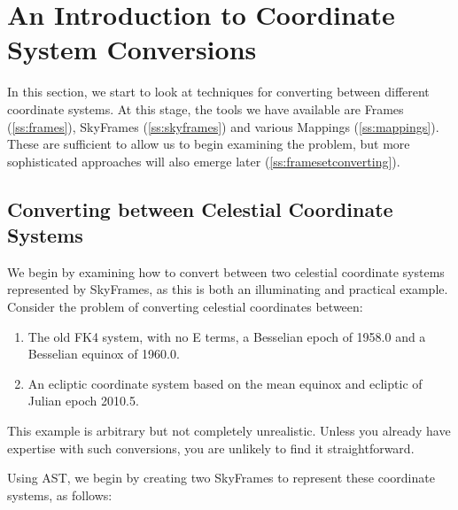 \documentclass[twoside,11pt]{article}
\newcommand{\secref}[1]{\S\ref{#1}}
\renewcommand{\secref}[1]{\ref{#1}}
\begin{document}

\cleardoublepage
\section{\label{ss:introducingconversion}An Introduction to Coordinate System Conversions}

In this section, we start to look at techniques for converting between
different coordinate systems.  At this stage, the tools we have
available are Frames (\secref{ss:frames}), SkyFrames
(\secref{ss:skyframes}) and various Mappings
(\secref{ss:mappings}). These are sufficient to allow us to begin
examining the problem, but more sophisticated approaches will also
emerge later (\secref{ss:framesetconverting}).

\subsection{\label{ss:convertingskyframes}Converting between Celestial Coordinate Systems}

We begin by examining how to convert between two celestial coordinate
systems represented by SkyFrames, as this is both an illuminating and
practical example.  Consider the problem of converting celestial
coordinates between:

\begin{enumerate}
\item The old FK4 system, with no E terms, a Besselian epoch of
1958.0 and a Besselian equinox of 1960.0.

\item An ecliptic coordinate system based on the mean equinox and
ecliptic of Julian epoch 2010.5.
\end{enumerate}

This example is arbitrary but not completely unrealistic. Unless you
already have expertise with such conversions, you are unlikely to find
it straightforward.

Using AST, we begin by creating two SkyFrames to represent these
coordinate systems, as follows:
\end{document}
